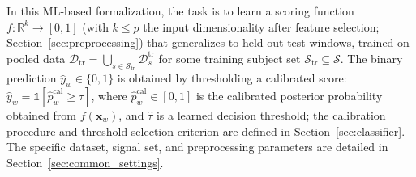 \documentclass[lettersize,journal]{IEEEtran}
\begin{document}
In this ML-based formalization, the task is to learn a scoring function $f\colon \mathbb{R}^k \to [0,1]$ (with $k \le p$ the input dimensionality after feature selection; Section~\ref{sec:preprocessing}) that generalizes to held-out test windows, trained on pooled data $\mathcal{D}_{\mathrm{tr}} = \bigcup_{s \in \mathcal{S}_{\mathrm{tr}}} \mathcal{D}_s^{\mathrm{tr}}$ for some training subject set $\mathcal{S}_{\mathrm{tr}} \subseteq \mathcal{S}$.
The binary prediction $\hat{y}_w \in \{0,1\}$ is obtained by thresholding a calibrated score: $\hat{y}_w = \mathbb{1}[\hat{p}_w^{\mathrm{cal}} \geq \hat{\tau}]$, where $\hat{p}_w^{\mathrm{cal}} \in [0,1]$ is the calibrated posterior probability obtained from $f(\mathbf{x}_w)$, and $\hat{\tau}$ is a learned decision threshold; the calibration procedure and threshold selection criterion are defined in Section~\ref{sec:classifier}.
The specific dataset, signal set, and preprocessing parameters are detailed in Section~\ref{sec:common_settings}.
\end{document}
